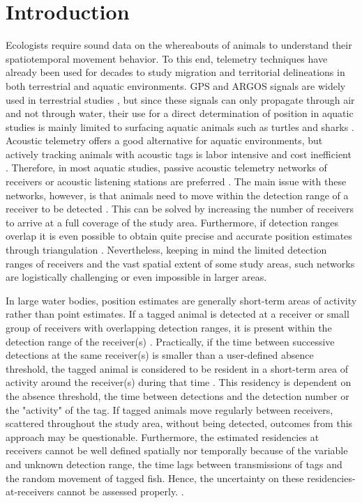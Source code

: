 \documentclass[preprint,12pt,authoryear]{elsarticle}
\begin{document}
\begin{spacing}{1.9}
\begin{frontmatter}
\end{frontmatter}

\linenumbers

\section{Introduction}
\label{intro}

Ecologists require sound data on the whereabouts of animals to understand their spatiotemporal movement behavior. To this end, telemetry techniques have already been used for decades to study migration and territorial delineations in both terrestrial and aquatic environments. GPS and ARGOS signals are widely used in terrestrial studies \citep{Hebblewhite2010,Svoboda2013}, but since these signals  can only propagate through air and not through water, their use for a direct determination of position in aquatic studies is mainly limited to surfacing aquatic animals such as turtles and sharks \citep{Fitzpatrick2012}. Acoustic telemetry offers a good alternative for aquatic environments, but actively tracking animals with acoustic tags is labor intensive and cost inefficient \citep{Heupel2006}. Therefore, in most aquatic studies, passive acoustic telemetry networks of receivers or acoustic listening stations are preferred \citep{Hedger2008,Thorstad2013b}. The main issue with these networks, however, is that animals need to move within the detection range of a receiver to be detected \citep{Both2013}. This can be solved by increasing the number of receivers to arrive at a full coverage of the study area. Furthermore, if detection ranges overlap it is even possible to obtain quite precise and accurate position estimates through triangulation \citep{Cooke2005}. Nevertheless, keeping in mind the limited detection ranges of receivers and the vast spatial extent of some study areas, such networks are logistically challenging or even impossible in larger areas. 

In large water bodies, position estimates are generally short-term areas of activity rather than point estimates. If a tagged animal is detected at a receiver or small group of receivers with overlapping detection ranges, it is present within the detection range of the receiver(s) \citep{Kessel2014}. Practically, if the time between successive detections at the same receiver(s) is smaller than a user-defined absence threshold, the tagged animal is considered to be resident in a short-term area of activity around the receiver(s) during that time \citep{Capello2015ATelemetry}. This residency is dependent on the absence threshold, the time between detections and the detection number or the "activity" of the tag. If tagged animals move regularly between receivers, scattered throughout the study area, without being detected, outcomes from this approach may be questionable. Furthermore, the estimated residencies at receivers cannot be well defined spatially nor temporally because of the variable and unknown detection range, the time lags between transmissions of tags and the random movement of tagged fish. Hence, the uncertainty on these residencies-at-receivers cannot be assessed properly. \citep{Ohta2005,Topping2011SiteMonitoring,Capello2015ATelemetry}.


\end{spacing}
\end{document}
